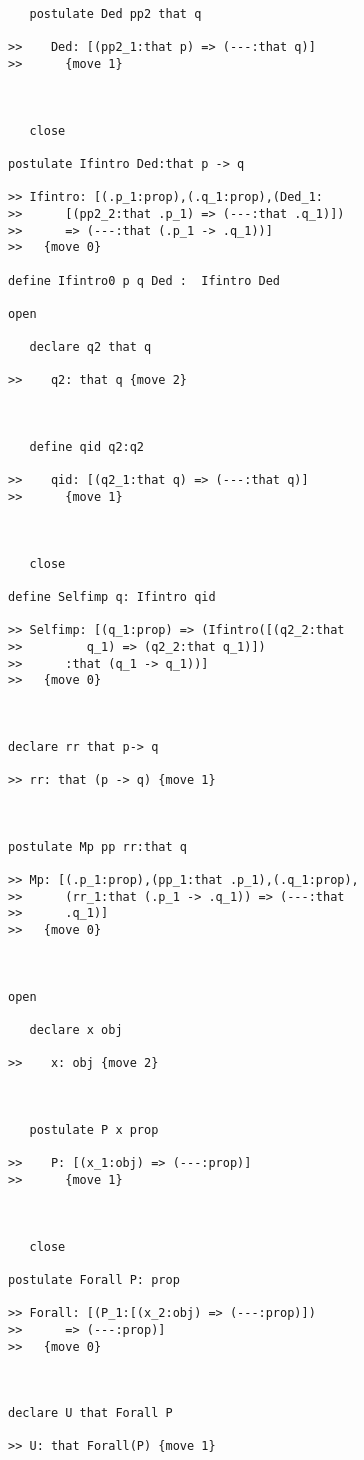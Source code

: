 \documentclass[12pt]{article}
\begin{document}
\begin{verbatim}
   postulate Ded pp2 that q

>>    Ded: [(pp2_1:that p) => (---:that q)]
>>      {move 1}



   close

postulate Ifintro Ded:that p -> q

>> Ifintro: [(.p_1:prop),(.q_1:prop),(Ded_1:
>>      [(pp2_2:that .p_1) => (---:that .q_1)])
>>      => (---:that (.p_1 -> .q_1))]
>>   {move 0}

define Ifintro0 p q Ded :  Ifintro Ded

open

   declare q2 that q

>>    q2: that q {move 2}



   define qid q2:q2

>>    qid: [(q2_1:that q) => (---:that q)]
>>      {move 1}



   close

define Selfimp q: Ifintro qid

>> Selfimp: [(q_1:prop) => (Ifintro([(q2_2:that
>>         q_1) => (q2_2:that q_1)])
>>      :that (q_1 -> q_1))]
>>   {move 0}



declare rr that p-> q

>> rr: that (p -> q) {move 1}



postulate Mp pp rr:that q

>> Mp: [(.p_1:prop),(pp_1:that .p_1),(.q_1:prop),
>>      (rr_1:that (.p_1 -> .q_1)) => (---:that
>>      .q_1)]
>>   {move 0}



open

   declare x obj

>>    x: obj {move 2}



   postulate P x prop

>>    P: [(x_1:obj) => (---:prop)]
>>      {move 1}



   close

postulate Forall P: prop

>> Forall: [(P_1:[(x_2:obj) => (---:prop)])
>>      => (---:prop)]
>>   {move 0}



declare U that Forall P

>> U: that Forall(P) {move 1}




\end{verbatim}
\end{document}
